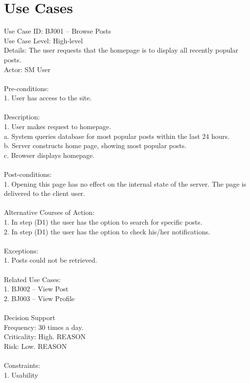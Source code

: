 \documentclass{report}
\begin{document}
\chapter{Use Cases}
\label{app:use_cases}
Use Case ID: BJ001 – Browse Posts\\
Use Case Level: High-level\\
Details: The user requests that the homepage is to display all recently popular posts.\\
Actor: SM User\\
\\
Pre-conditions:\\
1.	User has access to the site.\\
\\
Description:\\
1.	User makes request to homepage.\\
a.	System queries database for most popular posts within the last 24 hours.\\
b.	Server constructs home page, showing most popular posts.\\
c.	Browser displays homepage.\\
\\
Post-conditions: \\
1.	Opening this page has no effect on the internal state of the server. The page is delivered to the client user.\\
\\
Alternative Courses of Action:\\
1.	In step (D1) the user has the option to search for specific posts.\\
2.	In step (D1) the user has the option to check his/her notifications.\\
\\
Exceptions: \\
1.	Posts could not be retrieved.\\
\\
Related Use Cases: \\
1.	BJ002 – View Post\\
2.	BJ003 – View Profile\\
\\
Decision Support\\
     Frequency: 30 times a day.\\
     Criticality: High. REASON\\
     Risk: Low. REASON\\
\\
Constraints:\\
1.	Usability\\
\end{document}
